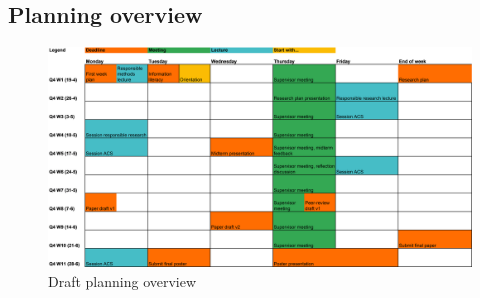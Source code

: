 \documentclass[english]{article}
\begin{document}
\subsection*{Planning overview}
\begin{figure}[h]
	\includegraphics[width=\linewidth]{Planning}
	\centering
	\caption{Draft planning overview}
\end{figure}


\pagebreak
\printbibliography

\end{document}
